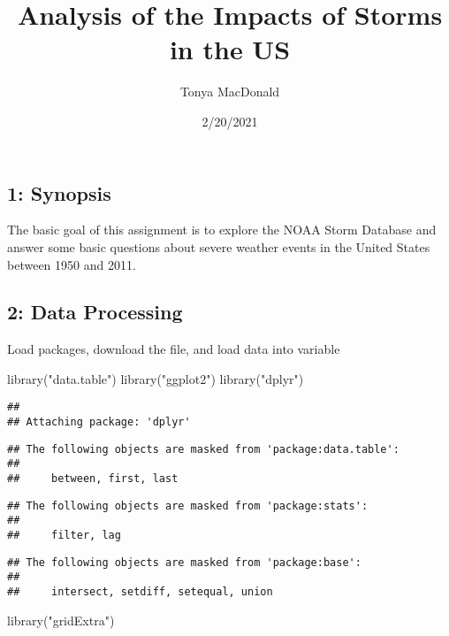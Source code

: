 \documentclass[
]{article}
\title{Analysis of the Impacts of Storms in the US}
\author{Tonya MacDonald}
\date{2/20/2021}
\newenvironment{Shaded}{\begin{snugshade}}{\end{snugshade}}
\newcommand{\FunctionTok}[1]{\textcolor[rgb]{0.00,0.00,0.00}{#1}}
\newcommand{\NormalTok}[1]{#1}
\newcommand{\StringTok}[1]{\textcolor[rgb]{0.31,0.60,0.02}{#1}}
\begin{document}
\maketitle

\hypertarget{synopsis}{%
\subsection{1: Synopsis}\label{synopsis}}

The basic goal of this assignment is to explore the NOAA Storm Database
and answer some basic questions about severe weather events in the
United States between 1950 and 2011.

\hypertarget{data-processing}{%
\subsection{2: Data Processing}\label{data-processing}}

Load packages, download the file, and load data into variable

\begin{Shaded}
\begin{Highlighting}[]
\FunctionTok{library}\NormalTok{(}\StringTok{"data.table"}\NormalTok{)}
\FunctionTok{library}\NormalTok{(}\StringTok{"ggplot2"}\NormalTok{)}
\FunctionTok{library}\NormalTok{(}\StringTok{"dplyr"}\NormalTok{)}
\end{Highlighting}
\end{Shaded}

\begin{verbatim}
## 
## Attaching package: 'dplyr'
\end{verbatim}

\begin{verbatim}
## The following objects are masked from 'package:data.table':
## 
##     between, first, last
\end{verbatim}

\begin{verbatim}
## The following objects are masked from 'package:stats':
## 
##     filter, lag
\end{verbatim}

\begin{verbatim}
## The following objects are masked from 'package:base':
## 
##     intersect, setdiff, setequal, union
\end{verbatim}

\begin{Shaded}
\begin{Highlighting}[]
\FunctionTok{library}\NormalTok{(}\StringTok{"gridExtra"}\NormalTok{)}
\end{Highlighting}
\end{Shaded}
\end{document}
